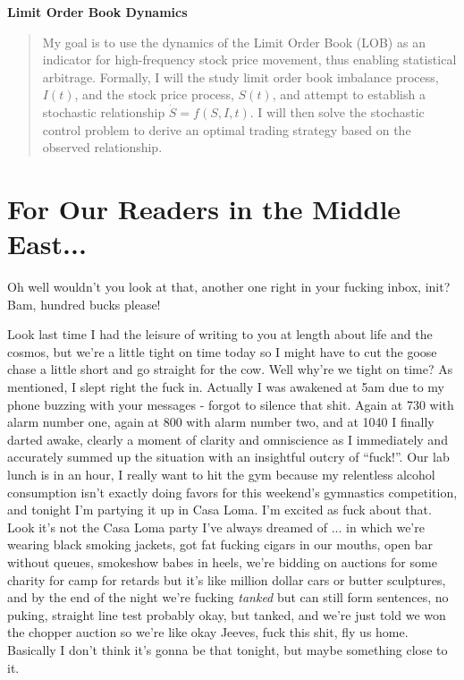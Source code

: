 \documentclass[12pt]{article}
\begin{document}
\mymascheader
\pagestyle{plain}
{\begin{center} {\large {\bf Limit Order Book Dynamics}} \end{center}}
\bigskip


\begin{quote}
My goal is to use the dynamics of the Limit Order Book (LOB) as an indicator for
high-frequency stock price movement, thus enabling statistical arbitrage. Formally, I will the study limit order book imbalance process, $I(t)$, and the stock price process, $S(t)$, and attempt to establish a stochastic relationship $\dot{S} = f(S,I,t)$. I will then solve the stochastic control problem to derive an optimal trading strategy based on the observed relationship.
\end{quote}

\section*{For Our Readers in the Middle East...}
Oh well wouldn't you look at that, another one right in your fucking inbox, init? Bam, hundred bucks please!

Look last time I had the leisure of writing to you at length about life and the cosmos, but we're a little tight on time today so I might have to cut the goose chase a little short and go straight for the cow. Well why're we tight on time? As mentioned, I slept right the fuck in. Actually I was awakened at 5am due to my phone buzzing with your messages - forgot to silence that shit. Again at 730 with alarm number one, again at 800 with alarm number two, and at 1040 I finally darted awake, clearly a moment of clarity and omniscience as I immediately and accurately summed up the situation with an insightful outcry of  ``fuck!''. Our lab lunch is in an hour, I really want to hit the gym because my relentless alcohol consumption isn't exactly doing favors for this weekend's gymnastics competition, and tonight I'm partying it up in Casa Loma. I'm excited as fuck about that. Look it's not the Casa Loma party I've always dreamed of ... in which we're wearing black smoking jackets, got fat fucking cigars in our mouths, open bar without queues, smokeshow babes in heels, we're bidding on auctions for some charity for camp for retards but it's like million dollar cars or butter sculptures, and by the end of the night we're fucking \textit{tanked} but can still form sentences, no puking, straight line test probably okay, but tanked, and we're just told we won the chopper auction so we're like okay Jeeves, fuck this shit, fly us home. Basically I don't think it's gonna be that tonight, but maybe something close to it. 
\end{document}
